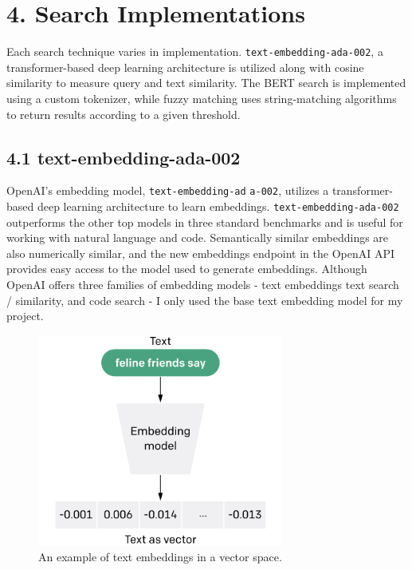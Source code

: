 \documentclass[
	a4paper, %
	10pt, %
	unnumberedsections, %
	twoside, %
]{LTJournalArticle}
\begin{document}
\section{4. Search Implementations}

Each search technique varies in implementation. \texttt{text-embedding-ada-002}, a transformer-based deep learning architecture is utilized along with cosine similarity to measure query and text similarity. The BERT search is implemented using a custom tokenizer, while fuzzy matching uses string-matching algorithms to return results according to a given threshold.

\subsection{4.1 text-embedding-ada-002}

OpenAI's embedding model, \texttt{text-embedding-ad} 
\texttt{a-002}, utilizes a transformer-based deep learning architecture to learn  embeddings. \texttt{text-embedding-ada-002} outperforms the other top models in three standard benchmarks and is useful for working with natural language and code. Semantically similar embeddings are also numerically similar, and the new embeddings endpoint in the OpenAI API provides easy access to the model used to generate embeddings. Although OpenAI offers three families of embedding models - text embeddings text search / similarity, and code search - I only used the base text embedding model for my project.


\begin{figure}[h]
    \includegraphics[width=8.1cm]{embedding.png}
    \caption{An example of text embeddings in a vector space.}
    \label{fig:embedding}
\end{figure}
\end{document}
